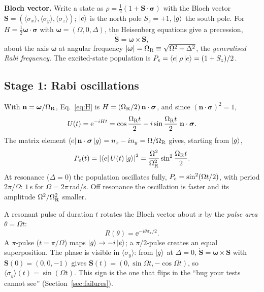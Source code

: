 \textbf{Bloch vector.} Write a state as $\rho = \frac12(1 + \mathbf{S}\cdot\boldsymbol\sigma)$
with the Bloch vector $\mathbf{S} = (\langle\sigma_x\rangle, \langle\sigma_y\rangle,
\langle\sigma_z\rangle)$; $\ket{e}$ is the north pole $S_z = +1$, $\ket{g}$ the south pole.
For $H = \frac12\boldsymbol\omega\cdot\boldsymbol\sigma$ with
$\boldsymbol\omega = (\Omega, 0, \Delta)$, the Heisenberg equations give a precession,
\begin{equation}
  \dot{\mathbf{S}} = \boldsymbol\omega \times \mathbf{S},
\end{equation}
about the axis $\boldsymbol\omega$ at angular frequency
$|\boldsymbol\omega| = \Omega_{\mathrm{R}} \equiv \sqrt{\Omega^2 + \Delta^2}$, the \emph{generalised Rabi
frequency}. The excited-state population is $P_e = \bra{e}\rho\ket{e} = (1 + S_z)/2$.

\subsection{Stage 1: Rabi oscillations}\label{sec:stage1}

With $\mathbf{n} = \boldsymbol\omega/\Omega_{\mathrm{R}}$, Eq.~\eqref{eq:H} is
$H = (\Omega_{\mathrm{R}}/2)\,\mathbf{n}\cdot\boldsymbol\sigma$, and since
$(\mathbf{n}\cdot\boldsymbol\sigma)^2 = 1$,
\begin{equation}
  U(t) = \mathrm{e}^{-iHt} = \cos\frac{\Omega_{\mathrm{R}} t}{2} - i \sin\frac{\Omega_{\mathrm{R}} t}{2}\;\mathbf{n}\cdot\boldsymbol\sigma .
\end{equation}
The matrix element $\bra{e}\mathbf{n}\cdot\boldsymbol\sigma\ket{g} = n_x - i n_y = \Omega/\Omega_{\mathrm{R}}$
gives, starting from $\ket{g}$,
\begin{equation}\label{eq:rabi}
  P_e(t) = \left|\bra{e}U(t)\ket{g}\right|^2 = \frac{\Omega^2}{\Omega_{\mathrm{R}}^2}\sin^2\frac{\Omega_{\mathrm{R}} t}{2} .
\end{equation}
At resonance ($\Delta = 0$) the population oscillates fully, $P_e = \sin^2(\Omega t/2)$,
with period $2\pi/\Omega$: $1$\,\textmu s for $\Omega = 2\pi$\,rad/\textmu s. Off
resonance the oscillation is faster and its amplitude $\Omega^2/\Omega_{\mathrm{R}}^2$ smaller.

A resonant pulse of duration $t$ rotates the Bloch vector about $x$ by the \emph{pulse
area} $\theta = \Omega t$:
\begin{equation}\label{eq:pulse}
  R(\theta) = \ee^{-i\theta\sigma_x/2}.
\end{equation}
A $\pi$-pulse ($t = \pi/\Omega$) maps $\ket{g} \to -i\ket{e}$; a $\pi/2$-pulse creates an
equal superposition. The phase is visible in $\langle\sigma_y\rangle$: from $\ket{g}$ at
$\Delta = 0$, $\dot{\mathbf{S}} = \boldsymbol\omega\times\mathbf{S}$ with $\mathbf{S}(0) =
(0, 0, -1)$ gives $\mathbf{S}(t) = (0, \sin\Omega t, -\cos\Omega t)$, so
$\langle\sigma_y\rangle(t) = \sin(\Omega t)$. This sign is the one that flips in the
``bug your tests cannot see'' (Section~\ref{sec:failures}).

